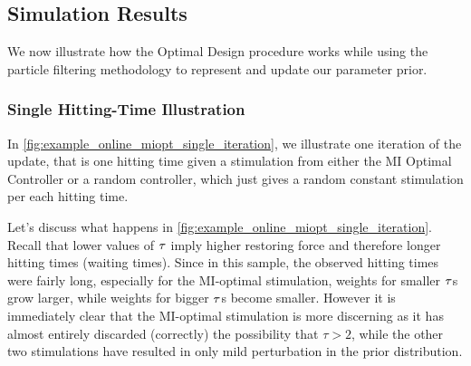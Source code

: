 \documentclass{article}
\begin{document}
% 


\subsection{Simulation Results}
We now illustrate how the Optimal Design procedure works while using the
particle filtering methodology to represent and update our parameter prior.

\subsubsection{Single Hitting-Time Illustration}
In \cref{fig:example_online_miopt_single_iteration}, we
illustrate one iteration of the update, that is one hitting time given a
stimulation from either the MI Optimal Controller or a random controller, which
just gives a random constant stimulation per each hitting time.

Let's discuss what happens in \cref{fig:example_online_miopt_single_iteration}.
Recall that lower values of ${ \tau }$ imply higher restoring force and therefore
longer hitting times (waiting times). Since in this sample, the observed hitting
times were fairly long, especially for the MI-optimal stimulation, weights for
smaller ${\tau}$s grow larger, while weights for bigger ${\tau}$s become smaller.
However it is immediately clear that the MI-optimal stimulation is more
discerning as it has almost entirely discarded (correctly) the
possibility that $\tau>2$, while the other two stimulations have resulted in
only mild perturbation in the prior distribution. 
\end{document}
